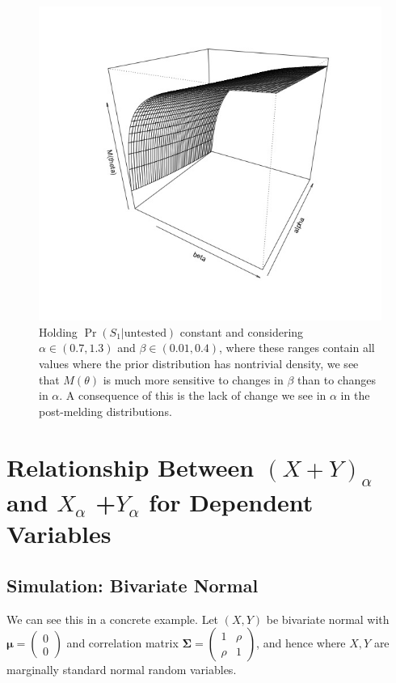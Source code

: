 \documentclass[12pt,twoside]{smiththesis}
\begin{document}
~ ~ ~ ~
\begin{figure}

{\centering \includegraphics[width=0.7\linewidth]{../presentation/figure/alpha_little_change} 

}

\caption{\label{fig:alpha-little-change}Holding $\Pr(S_1|\text{untested})$ constant and considering $\alpha \in (0.7,1.3)$ and $\beta \in (0.01,0.4)$, where these ranges contain all values where the prior distribution has nontrivial density, we see that $M(\theta)$ is much more sensitive to changes in $\beta$ than to changes in $\alpha$. A consequence of this is the lack of change we see in $\alpha$ in the post-melding distributions.}\label{fig:unnamed-chunk-119}
\end{figure}
\hypertarget{conservativeintervals}{%
\section{\texorpdfstring{Relationship Between \((X+Y)_\alpha\) and \(X_{\alpha}\) +\(Y_{\alpha}\) for Dependent Variables}{Relationship Between (X+Y)\_\textbackslash alpha and X\_\{\textbackslash alpha\} +Y\_\{\textbackslash alpha\} for Dependent Variables}}\label{conservativeintervals}}

\hypertarget{simulation-bivariate-normal}{%
\subsection{Simulation: Bivariate Normal}\label{simulation-bivariate-normal}}

We can see this in a concrete example. Let \((X,Y)\) be bivariate normal with \(\boldsymbol \mu = \begin{pmatrix} 0\\0\end{pmatrix}\) and correlation matrix \(\boldsymbol \Sigma = \begin{pmatrix} 1 & \rho \\ \rho & 1 \end{pmatrix}\), and hence where \(X, Y\) are marginally standard normal random variables.
\end{document}
